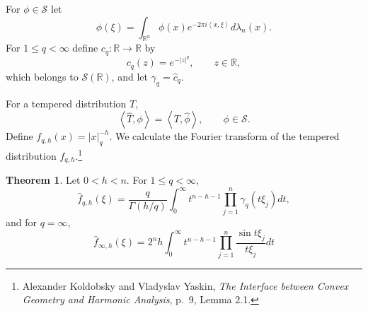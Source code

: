 \documentclass{article}
\newcommand{\inner}[2]{\left\langle #1, #2 \right\rangle}
\theoremstyle{definition}
\newtheorem{theorem}{Theorem}
\theoremstyle{definition}
\begin{document}
For $\phi \in \mathscr{S}$ let
\[
\widehat{\phi}(\xi) = \int_{\mathbb{R}^n} \phi(x) e^{-2\pi i\inner{x}{\xi}} d\lambda_n(x).
\]
For $1 \leq q < \infty$ define $c_q:\mathbb{R} \to \mathbb{R}$ by
\[
c_q(z) = e^{-|z|^q},\qquad z \in \mathbb{R}, 
\]
which belongs to $\mathscr{S}(\mathbb{R})$,
and let $\gamma_q = \widehat{c}_q$. 

For a tempered distribution $T$, 
\[
\inner{\widehat{T}}{\phi} = \inner{T}{\widehat{\phi}},\qquad \phi \in \mathscr{S}.
\]
Define $f_{q,h}(x)=|x|_q^{-h}$. 
We calculate the Fourier transform of the tempered distribution $f_{q,h}$.\footnote{Alexander Koldobsky and
Vladyslav Yaskin, {\em The Interface between Convex Geometry and Harmonic Analysis},
p.~9, Lemma 2.1.}

\begin{theorem}
Let $0<h<n$. 
For $1 \leq q < \infty$,
\[
\widehat{f}_{q,h}(\xi) = \frac{q}{\Gamma(h/q)} \int_0^\infty t^{n-h-1} \prod_{j=1}^n \gamma_q(t\xi_j) dt,
\]
and for $q=\infty$,
\[
\widehat{f}_{\infty,h}(\xi) = 2^n h \int_0^\infty t^{n-h-1} \prod_{j=1}^n \frac{\sin t\xi_j}{t\xi_j} dt
\]
\end{theorem}
\end{document}
